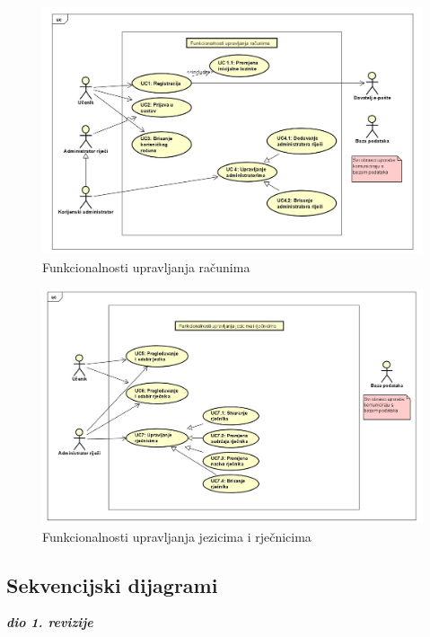					\begin{figure}[H]
						\includegraphics[scale=0.35]{dijagrami/dijagram2.jpg} 
						\centering
						\caption{Funkcionalnosti upravljanja računima}
						\label{fig:dijagram2}
					\end{figure}
					
					\begin{figure}[H]
						\includegraphics[scale=0.34]{dijagrami/dijagram3.jpg} 
						\centering
						\caption{Funkcionalnosti upravljanja jezicima i rječnicima}
						\label{fig:dijagram3}
					\end{figure}	
				
			\subsection{Sekvencijski dijagrami}
				
				\textbf{\textit{dio 1. revizije}}\\
				
